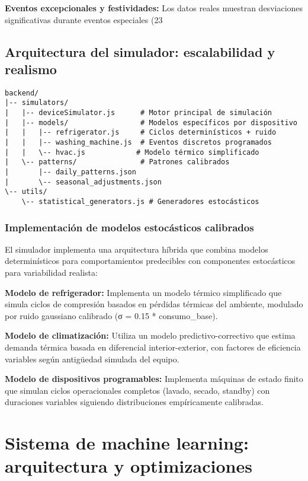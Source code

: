 \textbf{Eventos excepcionales y festividades:}
Los datos reales muestran desviaciones significativas durante eventos especiales (23%

\subsection{Arquitectura del simulador: escalabilidad y realismo}

\begin{lstlisting}[caption=Arquitectura del simulador de dispositivos IoT]
backend/
|-- simulators/
|   |-- deviceSimulator.js      # Motor principal de simulación
|   |-- models/                 # Modelos específicos por dispositivo
|   |   |-- refrigerator.js     # Ciclos determinísticos + ruido
|   |   |-- washing_machine.js  # Eventos discretos programados
|   |   \-- hvac.js            # Modelo térmico simplificado
|   \-- patterns/               # Patrones calibrados
|       |-- daily_patterns.json
|       \-- seasonal_adjustments.json
\-- utils/
    \-- statistical_generators.js # Generadores estocásticos
\end{lstlisting}

\subsubsection{Implementación de modelos estocásticos calibrados}

El simulador implementa una arquitectura híbrida que combina modelos determinísticos para comportamientos predecibles con componentes estocásticos para variabilidad realista:

\textbf{Modelo de refrigerador:} Implementa un modelo térmico simplificado que simula ciclos de compresión basados en pérdidas térmicas del ambiente, modulado por ruido gaussiano calibrado (σ = 0.15 * consumo_base).

\textbf{Modelo de climatización:} Utiliza un modelo predictivo-correctivo que estima demanda térmica basada en diferencial interior-exterior, con factores de eficiencia variables según antigüedad simulada del equipo.

\textbf{Modelo de dispositivos programables:} Implementa máquinas de estado finito que simulan ciclos operacionales completos (lavado, secado, standby) con duraciones variables siguiendo distribuciones empíricamente calibradas.

\section{Sistema de machine learning: arquitectura y optimizaciones}

